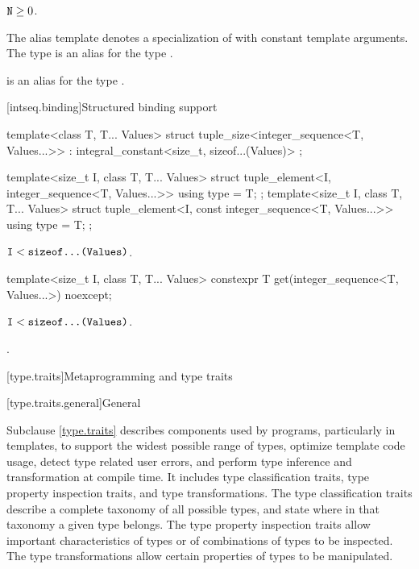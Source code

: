 \begin{itemdescr}
\pnum
\mandates
$\tcode{N} \geq 0$.

\pnum
The alias template
 denotes a specialization of
 with  constant template arguments.
The type  is an alias for the type
.
\begin{note}
 is an alias for the type
.
\end{note}
\end{itemdescr}

[intseq.binding]{Structured binding support}

%
%
\begin{itemdecl}
template<class T, T... Values>
  struct tuple_size<integer_sequence<T, Values...>>
    : integral_constant<size_t, sizeof...(Values)> { };

template<size_t I, class T, T... Values>
  struct tuple_element<I, integer_sequence<T, Values...>> {
    using type = T;
  };
template<size_t I, class T, T... Values>
  struct tuple_element<I, const integer_sequence<T, Values...>> {
    using type = T;
  };
\end{itemdecl}

\begin{itemdescr}
\pnum
\mandates
$\tcode{I} < \tcode{sizeof...(Values)}$.
\end{itemdescr}

%
\begin{itemdecl}
template<size_t I, class T, T... Values>
  constexpr T get(integer_sequence<T, Values...>) noexcept;
\end{itemdecl}

\begin{itemdescr}
\pnum
\mandates
$\tcode{I} < \tcode{sizeof...(Values)}$.

\pnum
\returns
{}.
\end{itemdescr}

[type.traits]{Metaprogramming and type traits}

[type.traits.general]{General}

\pnum
Subclause \ref{type.traits} describes components used by \Cpp{} programs, particularly in
templates, to support the widest possible range of types, optimize
template code usage, detect type related user errors, and perform
type inference and transformation at compile time. It includes type
classification traits, type property inspection traits, and type
transformations. The type classification traits describe a complete taxonomy
of all possible \Cpp{} types, and state where in that taxonomy a given
type belongs. The type property inspection traits allow important
characteristics of types or of combinations of types to be inspected. The
type transformations allow certain properties of types to be manipulated.

